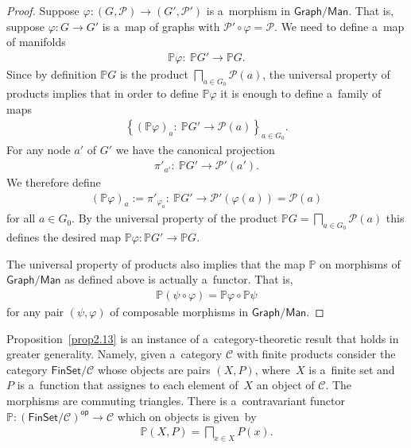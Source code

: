 \documentclass[pdftex]{sigma}
\numberwithin{equation}{section}
\begin{document}
\begin{proof}
Suppose $\varphi\colon (G,{\mathcal P})\to (G',{\mathcal P}')$ is a~morphism in $\mathsf{Graph}/\mathsf{Man}$.
That is, suppose $\varphi\colon G\to G'$ is a~map of graphs with ${\mathcal P}'\circ \varphi = {\mathcal P}$.
We need to def\/ine a~map of manifolds
\begin{gather*}
\mathbb{P} \varphi\colon \ \mathbb{P} G' \to \mathbb{P} G.
\end{gather*}
Since by def\/inition $\mathbb{P} G$ is the product $\bigsqcap\limits_{a\in G_0} {\mathcal P}(a)$, the universal property of
products implies that in order to def\/ine $\mathbb{P} \varphi$ it is enough to def\/ine a~family of maps
\begin{gather*}
\left\{(\mathbb{P} \varphi)_a\colon \ \mathbb{P} G' \to {\mathcal P} (a)\right\}_{a\in G_0}.
\end{gather*}
For any node $a'$ of $G'$ we have the canonical projection
\begin{gather*}
\pi'_{a'}\colon \ \mathbb{P} G'\to {\mathcal P}' (a').
\end{gather*}
We therefore def\/ine
\begin{gather*}
(\mathbb{P} \varphi)_a:= \pi'_{\varphi_a}\colon \ \mathbb{P} G' \to {\mathcal P}' (\varphi(a)) = {\mathcal P} (a)
\end{gather*}
for all $a\in G_0$.
By the universal property of the product $\mathbb{P} G= \bigsqcap\limits_{a\in G_0} {\mathcal P}(a)$ this def\/ines the desired
map $\mathbb{P} \varphi\colon \mathbb{P} G'\to \mathbb{P} G$.

The universal property of products also implies that the map $\mathbb{P}$ on morphisms of $\mathsf{Graph}/\mathsf{Man}$
as def\/ined above is actually a~functor.
That is,
\begin{gather*}
\mathbb{P} (\psi \circ \varphi) = \mathbb{P} \varphi\circ \mathbb{P} \psi
\end{gather*}
for any pair $(\psi, \varphi)$ of composable morphisms in $\mathsf{Graph}/\mathsf{Man}$.
\end{proof}

\begin{Remark}
Proposition~\ref{prop2.13} is an instance of a~category-theoretic result that holds in greater generality.
Namely, given a~category $\mathscr{C}$ with f\/inite products consider the category $\mathsf{FinSet}/\mathscr{C}$ whose
objects are pairs $(X, P)$, where~$X$ is a~f\/inite set and~$P$ is a~function that assignes to each element of~$X$ an object of $\mathscr{C}$.
The morphisms are commuting triangles.
There is a~contravariant functor $\mathbb{P}: (\mathsf{FinSet}/\mathscr{C})^{{\mathsf{op}}} \to \mathscr{C}$ which on objects is
given~by
\begin{gather*}
\mathbb{P}(X,P) = \bigsqcap_{x\in X} P(x).
\end{gather*}
\end{Remark}
\end{document}
